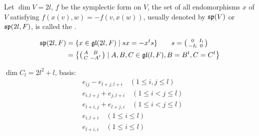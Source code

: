 \begin{exam}[$C_l$]
  Let $\dim V=2l$, $f$ be the symplectic form on $V$, the set of all endomorphisms $x$ of $V$ satisfying $f(x(v),w)=-f(v,x(w))$, usually denoted by $\sp(V)$ or $\sp(2l,F)$, is called the .

  \begin{align*}
    \sp(2l,F)&=\{x\in \gl(2l,F)\mid sx=-x^ts \}\qquad s=\begin{pmatrix}
                                                               \begin{smallmatrix}
                                                               0 & I_l \\
                                                               -I_l & 0 \\
                                                               \end{smallmatrix}
                                                             \end{pmatrix}
                                                             \\
    &=\left\{ \begin{pmatrix}
           \begin{smallmatrix}
           A & B \\
           C & -A^t \\
           \end{smallmatrix}
         \end{pmatrix}
         \mid A,B,C\in \gl(l,F), B=B^t,C=C^t
     \right\}
  \end{align*}

  $\dim C_l=2l^2+l$, basis:
  \begin{align*}
    & e_{ij}-e_{l+j,l+i} \quad (1\leqslant i,j\leqslant l) \\
    & e_{i,l+j}+e_{j,l+i} \quad (1\leqslant i<j\leqslant l) \\
    & e_{l+i,j}+e_{l+j,i} \quad (1\leqslant i<j\leqslant l) \\
    & e_{i,l+i} \quad (1\leqslant i\leqslant l) \\
    & e_{l+i,i} \quad (1\leqslant i\leqslant l)
  \end{align*}
\end{exam}

